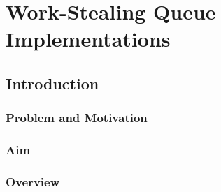 
\part{Work-Stealing Queue Implementations}
\label{part:queues}

\chapter{Introduction}
\label{chap:queues-introduction}


\section{Problem and Motivation}
\label{sec:queues-intro-problem-and-motivation}


\section{Aim}
\label{sec:queues-intro-aim}


\section{Overview}
\label{sec:queues-intro-overview}


